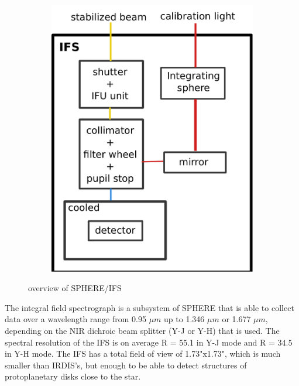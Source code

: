 \documentclass[twoside,single,12pt]{lion-msc}
\begin{document}
\begin{figure}[hb]
\begin{subfigure}{.30\textwidth}
  \includegraphics[trim={0cm 0cm 0cm 0cm},clip,width=1\linewidth]{overview}
  \caption{}
\end{subfigure}
\caption{overview of SPHERE/IFS}
\label{fig:overviewIFS}
\end{figure}

The integral field spectrograph is a subsystem of SPHERE that is able to collect data over a wavelength range from 0.95 $\mu m$ up to 1.346 $\mu m$ or 1.677 $\mu m$,  depending on the NIR dichroic beam splitter (Y-J or Y-H) that is used. The spectral resolution of the IFS is on average R = 55.1 in Y-J mode and R = 34.5 in Y-H mode. The IFS has a total field of view of 1.73"x1.73", which is much smaller than IRDIS's, but enough to be able to detect structures of protoplanetary disks close to the star.
\clearpage 
\end{document}
